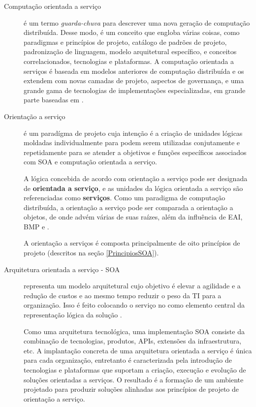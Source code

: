 \begin{description}
\item [Computação orientada a serviço] é um termo \textit{guarda-chuva} para
descrever uma nova geração de computação distribuída. Desse modo, é um conceito
que engloba várias coisas, como paradigmas e princípios de projeto, catálogo de
padrões de projeto, padronização de linguagem, modelo arquitetural específico, e
conceitos correlacionados, tecnologias e plataformas.
A computação orientada a serviços é baseada em modelos anteriores de computação
distribuída e os extendem com novas camadas de projeto, aspectos de governança,
e uma grande gama de tecnologias de implementações especializadas, em grande
parte baseadas em \ws{} \cite{erl2009web}.

\item [Orientação a serviço] é um paradígma de projeto cuja intenção é a criação
de unidades lógicas moldadas individualmente para podem serem utilizadas
conjutamente e repetidamente para se atender a objetivos e funções específicos
associados com SOA e computação orientada a serviço.

A lógica concebida de acordo com orientação a serviço pode ser designada de
\textbf{orientada a serviço}, e as unidades da lógica orientada a serviço são
referenciadas como \textbf{serviços}. Como um paradigma de computação
distribuída, a orientação a serviço pode ser comparada a orientação a objetos,
de onde advém várias de suas raízes, além da influência de EAI, BMP e \ws
\cite{erl2009web}.

A orientação a serviços é composta principalmente de oito princípios de projeto
(descritos na seção \ref{PrincipiosSOA}).

\item [Arquitetura orientada a serviço - SOA] representa um modelo arquitetural
cujo objetivo é elevar a agilidade e a redução de custos e ao mesmo tempo
reduzir o peso da TI para a organização. Isso é feito colocando o serviço no
como elemento central da representação lógica da solução \cite{erl2009web}.

Como uma arquitetura tecnológica, uma implementação SOA consiste da combinação
de tecnologias, produtos, APIs, extensões da infraestrutura, etc. A implantação
concreta de uma arquitetura orientada a serviço é única para cada organização,
entretanto é caracterizada pela introdução de tecnologias e plataformas que
suportam a criação, execução e evolução de soluções orientadas a serviços. O
resultado é a formação de um ambiente projetado para produzir soluções alinhadas
aos princípios de projeto de orientação a serviço.


\end{description}
